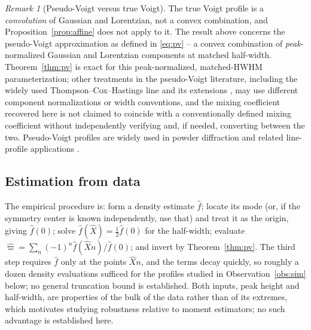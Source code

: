 \documentclass[11pt]{article}
\theoremstyle{definition}
\theoremstyle{plain}
\theoremstyle{remark}
\newtheorem{remark}[definition]{Remark}
\begin{document}
\begin{remark}[Pseudo-Voigt versus true Voigt]\label{rem:voigt}
The true Voigt profile is a \emph{convolution} of Gaussian and Lorentzian, not a convex
combination, and Proposition~\ref{prop:affine} does not apply to it. The result above
concerns the pseudo-Voigt approximation as defined in \eqref{eq:pv} -- a convex
combination of \emph{peak}-normalized Gaussian and Lorentzian components at matched
half-width. Theorem~\ref{thm:pv} is exact for this peak-normalized, matched-HWHM
parameterization; other treatments in the pseudo-Voigt literature, including the
widely used Thompson--Cox--Hastings line \cite{TCH1987} and its extensions
\cite{IdaAndoToraya2000}, may use different component normalizations or width
conventions, and the mixing coefficient recovered here is not claimed to coincide with
a conventionally defined mixing coefficient without independently verifying and, if
needed, converting between the two. Pseudo-Voigt profiles are widely used in powder
diffraction and related line-profile applications \cite{TCH1987}.
\end{remark}

\subsection{Estimation from data}

The empirical procedure is: form a density estimate $\hat f$; locate its mode (or, if
the symmetry center is known independently, use that) and treat it as the origin,
giving $\hat f(0)$; solve $\hat f(\hat X)=\tfrac12\hat f(0)$ for the half-width; evaluate
$\hat\varpi=\sum_n(-1)^n\hat f(\hat Xn)/\hat f(0)$; and invert by
Theorem~\ref{thm:pv}. The third step requires $\hat f$ only at the points $\hat Xn$, and
the terms decay quickly, so roughly a dozen density evaluations sufficed for the profiles
studied in Observation~\ref{obs:sim} below; no general truncation bound is established.
Both inputs, peak height and half-width, are properties of the bulk of the data rather
than of its extremes, which motivates studying robustness relative to moment estimators;
no such advantage is established here.
\end{document}
